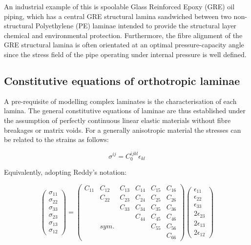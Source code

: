 An industrial example of this is spoolable Glass Reinforced Epoxy (GRE) oil piping, which has a central GRE structural lamina sandwiched between two non-structural Polyethylene (PE) laminae intended to provide the structural layer chemical and environmental protection. Furthermore, the fibre alignment of the GRE structural lamina is often orientated at an optimal pressure-capacity angle since the stress field of the pipe operating under internal pressure is well defined.

\subsection{Constitutive equations of orthotropic laminae}

A pre-requisite of modelling complex laminates is the characterisation of each lamina. The general constitutive equations of laminae are thus established under the assumption of perfectly continuous linear elastic materials without fibre breakages or matrix voids. For a generally anisotropic material the stresses can be related to the strains as follows:

\begin{equation} 
\sigma^{ij} = C_0^{ijkl} \epsilon_{kl}
\label{eqscomp1}
\end{equation}

Equivalently, adopting Reddy's \cite{reddy2004mechanics} notation:

\begin{equation} 
\begin{pmatrix}
\sigma_{11} \\
\sigma_{22} \\
\sigma_{33} \\
\sigma_{23} \\
\sigma_{13} \\
\sigma_{12}
\end{pmatrix}
=
\begin{pmatrix}
C_{11} & C_{12} & C_{13} & C_{14} & C_{15} & C_{16} \\
\  & C_{22} & C_{23} & C_{24} & C_{25} & C_{26} \\
\  & \  & C_{33} & C_{34} & C_{35} & C_{36} \\
\  & \  & \  & C_{44} & C_{45} & C_{46} \\
\  & sym. & \  & \ & C_{55} & C_{56} \\
\  & \  & \  & \  & \  & C_{66}
\end{pmatrix}
\begin{pmatrix}
\epsilon_{11} \\
\epsilon_{22} \\
\epsilon_{33} \\
2\epsilon_{23} \\
2\epsilon_{13} \\
2\epsilon_{12}
\end{pmatrix}
\label{eqscomp2}
\end{equation}

